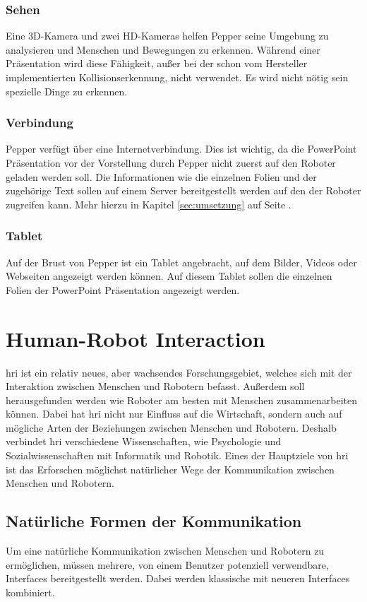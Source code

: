 \subsubsection{Sehen}\label{sec:sehen}
Eine 3D-Kamera und zwei HD-Kameras helfen Pepper seine Umgebung zu analysieren
und Menschen und Bewegungen zu erkennen. Während einer Präsentation wird diese
Fähigkeit, außer bei der schon vom Hersteller implementierten
Kollisionserkennung, nicht verwendet. Es wird nicht nötig sein spezielle Dinge
zu erkennen.

\subsubsection{Verbindung}\label{sec:verbindung}
Pepper verfügt über eine Internetverbindung. Dies ist wichtig, da die PowerPoint
Präsentation vor der Vorstellung durch Pepper nicht zuerst auf den Roboter
geladen werden soll. Die Informationen wie die einzelnen Folien und der
zugehörige Text sollen auf einem Server bereitgestellt werden auf den der
Roboter zugreifen kann. Mehr hierzu in Kapitel \ref{sec:umsetzung} auf Seite
\pageref{sec:umsetzung}.

\subsubsection{Tablet}\label{sec:tablet}
Auf der Brust von Pepper ist ein Tablet angebracht, auf dem Bilder, Videos oder
Webseiten angezeigt werden können. Auf diesem Tablet sollen die einzelnen Folien
der PowerPoint Präsentation angezeigt werden. \cite{SoftBankII2018}

\section{Human-Robot Interaction}\label{sec:hri}
\ac{hri} ist ein relativ neues, aber wachsendes Forschungsgebiet, welches sich
mit der Interaktion zwischen Menschen und Robotern befasst. Außerdem soll
herausgefunden werden wie Roboter am besten mit Menschen zusammenarbeiten
können. Dabei hat \ac{hri} nicht nur Einfluss auf die Wirtschaft, sondern auch
auf mögliche Arten der Beziehungen zwischen Menschen und Robotern. Deshalb
verbindet \ac{hri} verschiedene Wissenschaften, wie Psychologie und
Sozialwissenschaften mit Informatik und Robotik. Eines der Hauptziele von
\ac{hri} ist das Erforschen möglichst natürlicher Wege der Kommunikation
zwischen Menschen und Robotern. \cite{Dautenhahn2011}

\subsection{Natürliche Formen der
Kommunikation}\label{sec:nat-formen-kommunikation}
Um eine natürliche Kommunikation zwischen Menschen und Robotern zu ermöglichen,
müssen mehrere, von einem Benutzer potenziell verwendbare, Interfaces
bereitgestellt werden. Dabei werden klassische mit neueren Interfaces
kombiniert.

